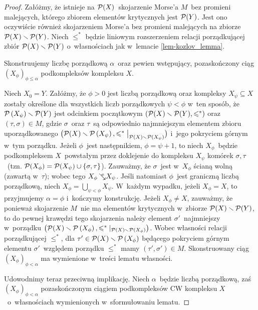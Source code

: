 \begin{proof}
Załóżmy, że istnieje na $\mathcal{P}(X)$~skojarzenie Morse'a $M$~bez promieni malejących, którego zbiorem elementów krytycznych jest $\mathcal{P}(Y)$. Jest ono oczywiście również skojarzeniem Morse'a bez promieni malejących na zbiorze \mbox{$\mathcal{P}(X)\smallsetminus \mathcal{P}(Y)$}. Niech $\leq^*$ będzie liniowym rozszerzeniem relacji porządkującej zbiór \mbox{$\mathcal{P}(X)\smallsetminus \mathcal{P}(Y)$} o~własnościach jak w~lemacie \ref{lem-kozlov_lemma}.

Skonstruujemy liczbę porządkową $\alpha$~oraz pewien wstępujący, pozaskończony ciąg $\left(X_\phi\right)_{\phi\leq\alpha}$ podkompleksów kompleksu $X$. 

Niech $X_0=Y$. Załóżmy, że $\phi>0$ jest liczbą porządkową oraz kompleksy $X_\psi\subseteq X$ zostały określone dla wszystkich liczb porządkowych $\psi<\phi$ w~ten sposób, że $\mathcal{P}\left(X_\psi\right)\smallsetminus\mathcal{P}(Y)$ jest odcinkiem początkowym $(\mathcal{P}(X)\smallsetminus\mathcal{P}(Y),\leqslant^*)$ oraz $(\tau,\sigma)\in M$, gdzie $\sigma$~oraz $\tau$~są odpowiednio najmniejszym elementem zbioru uporządkowanego $\bigl(\mathcal{P}(X)\smallsetminus\mathcal{P}\left(X_\psi\right),\leqslant^*\big|_{\mathcal{P}(X)\smallsetminus\mathcal{P}\left(X_\psi\right)}\bigr)$ i~jego pokryciem górnym w~tym porządku. Jeżeli $\phi$~jest następnikiem, $\phi=\psi+1$, to niech $X_\phi$~będzie podkompleksem $X$~powstałym przez doklejenie do kompleksu $X_\psi$ komórek $\sigma,\tau$~(tzn. $\mathcal{P}(X_\phi)=\mathcal{P}(X_\psi)\cup\{\sigma,\tau\}$). Zauważmy, że $\sigma$~jest w~$X_\phi$ ścianą wolną (zawartą w~$\tau$); wobec tego $X_\phi\mbox{$\hspace{2pt}\searrow\hspace{-9pt}^\mathrm{e}\hspace{2pt}$} X_\psi$. Jeśli natomiast $\phi$~jest graniczną liczbą porządkową, niech $X_\phi=\bigcup_{\psi<\phi} X_\psi$. W~każdym wypadku, jeżeli $X_\phi=X$, to przyjmujemy $\alpha=\phi$ i~kończymy konstrukcję. Jeżeli $X_\phi\not= X$, zauważmy, że ponieważ skojarzenie $M$~nie ma elementów krytycznych w~zbiorze $\mathcal{P}(X)\smallsetminus \mathcal{P}(Y)$, to do pewnej krawędzi tego skojarzenia należy element $\sigma'$~najmniejszy w~porządku $\bigl(\mathcal{P}(X)\smallsetminus\mathcal{P}\left(X_\phi\right),\leqslant^*|_{\mathcal{P}(X)\smallsetminus\mathcal{P}\left(X_\phi\right)}\bigr)$. Wobec własności relacji porządkującej $\leq^*$, dla $\tau'\in \mathcal{P}(X)\smallsetminus\mathcal{P}\left(X_\phi\right)$ będącego pokryciem górnym elementu $\sigma'$~względem porządku $\leq^*$ mamy $(\tau',\sigma')\in M$. Skonstruowany ciąg $\left(X_\phi\right)_{\phi<\alpha}$ ma wymienione w~treści lematu własności.

Udowodnimy teraz przeciwną implikację. Niech $\alpha$~będzie liczbą porządkową, zaś $(X_\phi)_{\phi<\alpha}$ pozaskończonym ciągiem podkompleksów CW kompleksu $X$~o~własnościach wymienionych w~sformułowaniu lematu.


\end{proof}
